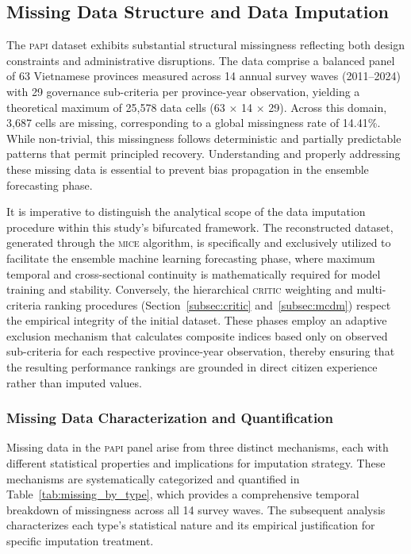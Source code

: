 \documentclass[12pt,a4paper]{article}
\newcommand{\PAPI}{\textsc{papi}\xspace}
\newcommand{\MICE}{\textsc{mice}\xspace}
\newcommand{\CRITIC}{\textsc{critic}\xspace}
\begin{document}
\subsection{Missing Data Structure and Data Imputation}
\label{subsec:missing}


The \PAPI dataset exhibits substantial structural missingness reflecting both design constraints and administrative disruptions. The data comprise a balanced panel of 63 Vietnamese provinces measured across 14 annual survey waves (2011--2024) with 29 governance sub-criteria per province-year observation, yielding a theoretical maximum of 25,578 data cells (63 $\times$ 14 $\times$ 29). Across this domain, 3,687 cells are missing, corresponding to a global missingness rate of 14.41\%. While non-trivial, this missingness follows deterministic and partially predictable patterns that permit principled recovery. Understanding and properly addressing these missing data is essential to prevent bias propagation in the ensemble forecasting phase.

It is imperative to distinguish the analytical scope of the data imputation procedure within this study's bifurcated framework. The reconstructed dataset, generated through the \MICE algorithm, is specifically and exclusively utilized to facilitate the ensemble machine learning forecasting phase, where maximum temporal and cross-sectional continuity is mathematically required for model training and stability. Conversely, the hierarchical \CRITIC weighting and multi-criteria ranking procedures (Section~\ref{subsec:critic} and~\ref{subsec:mcdm}) respect the empirical integrity of the initial dataset. These phases employ an adaptive exclusion mechanism that calculates composite indices based only on observed sub-criteria for each respective province-year observation, thereby ensuring that the resulting performance rankings are grounded in direct citizen experience rather than imputed values.

\subsubsection{Missing Data Characterization and Quantification}

Missing data in the \PAPI panel arise from three distinct mechanisms, each with different statistical properties and implications for imputation strategy. These mechanisms are systematically categorized and quantified in Table~\ref{tab:missing_by_type}, which provides a comprehensive temporal breakdown of missingness across all 14 survey waves. The subsequent analysis characterizes each type's statistical nature and its empirical justification for specific imputation treatment.
\end{document}
